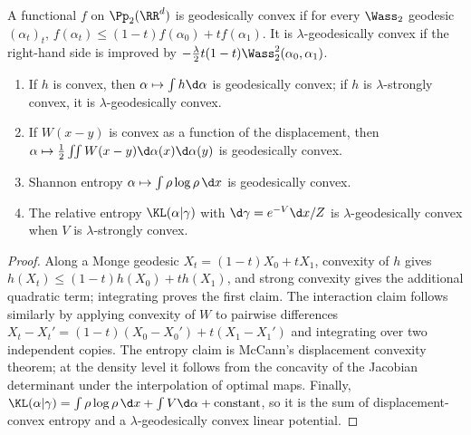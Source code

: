 \begin{defn}\label{def-geodesic-convexity}
A functional $f$ on $\Pp_2(\RR^d)$ is geodesically convex if for every $\Wass_2$ geodesic $(\alpha_t)_t$, \(f(\alpha_t)\leq (1-t)f(\alpha_0)+t f(\alpha_1).\)
It is $\lambda$-geodesically convex if the right-hand side is improved by $-\frac{\lambda}{2}t(1-t)\Wass_2^2(\alpha_0,\alpha_1)$.
\end{defn}
\begin{prop}\label{prop-basic-geodesic-convexity}
\begin{enumerate}
\item If $h$ is convex, then $\alpha\mapsto\int h\d\alpha$ is geodesically convex; if $h$ is $\lambda$-strongly convex, it is $\lambda$-geodesically convex.
\item If $W(x-y)$ is convex as a function of the displacement, then $\alpha\mapsto\frac12\iint W(x-y)\d\alpha(x)\d\alpha(y)$ is geodesically convex.
\item Shannon entropy $\alpha\mapsto\int\rho\log\rho\,\d x$ is geodesically convex.
\item The relative entropy $\KL(\alpha|\gamma)$ with $\d\gamma=e^{-V}\d x/Z$ is $\lambda$-geodesically convex when $V$ is $\lambda$-strongly convex.
\end{enumerate}
\end{prop}
\begin{proof}
Along a Monge geodesic $X_t=(1-t)X_0+tX_1$, convexity of $h$ gives $h(X_t)\leq(1-t)h(X_0)+t h(X_1)$, and strong convexity gives the additional quadratic term; integrating proves the first claim. The interaction claim follows similarly by applying convexity of $W$ to pairwise differences $X_t-X_t'=(1-t)(X_0-X_0')+t(X_1-X_1')$ and integrating over two independent copies. The entropy claim is McCann's displacement convexity theorem; at the density level it follows from the concavity of the Jacobian determinant under the interpolation of optimal maps. Finally, $\KL(\alpha|\gamma)=\int\rho\log\rho\,\d x+\int V\d\alpha+\mathrm{constant}$, so it is the sum of displacement-convex entropy and a $\lambda$-geodesically convex linear potential.
\end{proof}
